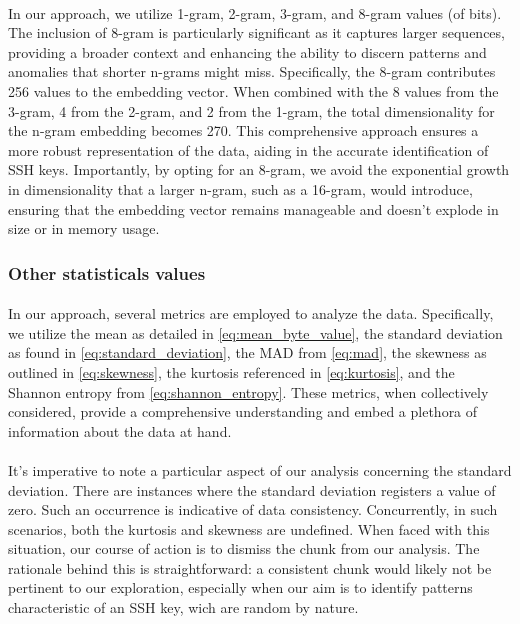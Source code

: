         \paragraph{}In our approach, we utilize 1-gram, 2-gram, 3-gram, and 8-gram values (of bits). The inclusion of 8-gram is particularly significant as it captures larger sequences, providing a broader context and enhancing the ability to discern patterns and anomalies that shorter n-grams might miss. Specifically, the 8-gram contributes 256 values to the embedding vector. When combined with the 8 values from the 3-gram, 4 from the 2-gram, and 2 from the 1-gram, the total dimensionality for the n-gram embedding becomes 270. This comprehensive approach ensures a more robust representation of the data, aiding in the accurate identification of SSH keys. Importantly, by opting for an 8-gram, we avoid the exponential growth in dimensionality that a larger n-gram, such as a 16-gram, would introduce, ensuring that the embedding vector remains manageable and doesn't explode in size or in memory usage.
        

    \subsubsection{Other statisticals values}
        \paragraph{}In our approach, several metrics are employed to analyze the data. Specifically, we utilize the mean as detailed in \ref{eq:mean_byte_value}, the standard deviation as found in \ref{eq:standard_deviation}, the MAD from \ref{eq:mad}, the skewness as outlined in \ref{eq:skewness}, the kurtosis referenced in \ref{eq:kurtosis}, and the Shannon entropy from \ref{eq:shannon_entropy}. These metrics, when collectively considered, provide a comprehensive understanding and embed a plethora of information about the data at hand.

        \paragraph{}It's imperative to note a particular aspect of our analysis concerning the standard deviation. There are instances where the standard deviation registers a value of zero. Such an occurrence is indicative of data consistency. Concurrently, in such scenarios, both the kurtosis and skewness are undefined. When faced with this situation, our course of action is to dismiss the \gls{chunk} from our analysis. The rationale behind this is straightforward: a consistent \gls{chunk} would likely not be pertinent to our exploration, especially when our aim is to identify patterns characteristic of an SSH key, wich are random by nature.
